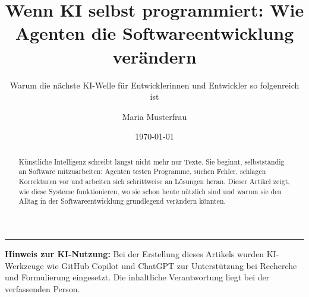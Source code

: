 \documentclass[%
   final,%
   paper=a4,%
   pagesize=auto,%
   fontsize=10pt,%
   twocolumn,%
   version=last,%
   parskip=half%
]{scrartcl}
\author{Maria Musterfrau}
\title{Wenn KI selbst programmiert: Wie Agenten die Softwareentwicklung verändern}
\subtitle{Warum die nächste KI-Welle für Entwicklerinnen und Entwickler so folgenreich ist}
\date{\today}
\begin{document}
\maketitle

\begin{abstract}
\noindent
Künstliche Intelligenz schreibt längst nicht mehr nur Texte. Sie beginnt, selbstständig an Software mitzuarbeiten: Agenten testen Programme, suchen Fehler, schlagen Korrekturen vor und arbeiten sich schrittweise an Lösungen heran. Dieser Artikel zeigt, wie diese Systeme funktionieren, wo sie schon heute nützlich sind und warum sie den Alltag in der Softwareentwicklung grundlegend verändern könnten.
\end{abstract}



\printbibliography[title=Quellen und weiterführende Literatur]

\vspace{1em}
\noindent\rule{\columnwidth}{0.4pt}
{\footnotesize\textbf{Hinweis zur KI-Nutzung:} Bei der Erstellung dieses Artikels wurden KI-Werkzeuge wie GitHub Copilot und ChatGPT zur Unterstützung bei Recherche und Formulierung eingesetzt. Die inhaltliche Verantwortung liegt bei der verfassenden Person.}
\end{document}
